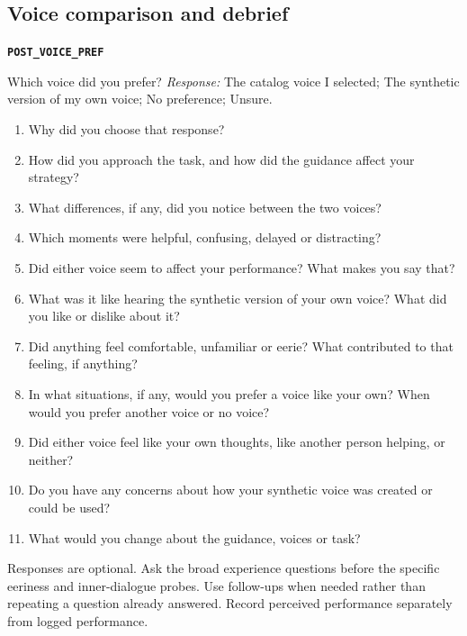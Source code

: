 \documentclass[11pt,letterpaper]{article}
\newcommand{\qid}[1]{\par\smallskip\textbf{\texttt{#1}}\par}
\begin{document}
\subsection{Voice comparison and debrief}
\qid{POST\_VOICE\_PREF}
Which voice did you prefer?
\textit{Response:} The catalog voice I selected; The synthetic version of my own voice; No preference; Unsure.
\begin{enumerate}
\item Why did you choose that response?
\item How did you approach the task, and how did the guidance affect your strategy?
\item What differences, if any, did you notice between the two voices?
\item Which moments were helpful, confusing, delayed or distracting?
\item Did either voice seem to affect your performance? What makes you say that?
\item What was it like hearing the synthetic version of your own voice? What did you like or dislike about it?
\item Did anything feel comfortable, unfamiliar or eerie? What contributed to that feeling, if anything?
\item In what situations, if any, would you prefer a voice like your own? When would you prefer another voice or no voice?
\item Did either voice feel like your own thoughts, like another person helping, or neither?
\item Do you have any concerns about how your synthetic voice was created or could be used?
\item What would you change about the guidance, voices or task?
\end{enumerate}
Responses are optional. Ask the broad experience questions before the specific eeriness and inner-dialogue probes. Use follow-ups when needed rather than repeating a question already answered. Record perceived performance separately from logged performance.
\end{document}
